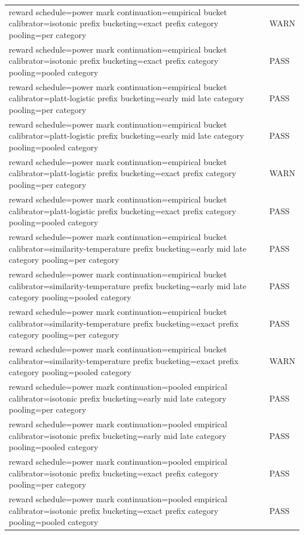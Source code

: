 \begin{table}[h]
\begin{tabular}{ll}
reward schedule=power mark  continuation=empirical bucket  calibrator=isotonic  prefix bucketing=exact prefix  category pooling=per category & WARN \\
reward schedule=power mark  continuation=empirical bucket  calibrator=isotonic  prefix bucketing=exact prefix  category pooling=pooled category & PASS \\
reward schedule=power mark  continuation=empirical bucket  calibrator=platt-logistic  prefix bucketing=early mid late  category pooling=per category & PASS \\
reward schedule=power mark  continuation=empirical bucket  calibrator=platt-logistic  prefix bucketing=early mid late  category pooling=pooled category & PASS \\
reward schedule=power mark  continuation=empirical bucket  calibrator=platt-logistic  prefix bucketing=exact prefix  category pooling=per category & WARN \\
reward schedule=power mark  continuation=empirical bucket  calibrator=platt-logistic  prefix bucketing=exact prefix  category pooling=pooled category & PASS \\
reward schedule=power mark  continuation=empirical bucket  calibrator=similarity-temperature  prefix bucketing=early mid late  category pooling=per category & PASS \\
reward schedule=power mark  continuation=empirical bucket  calibrator=similarity-temperature  prefix bucketing=early mid late  category pooling=pooled category & PASS \\
reward schedule=power mark  continuation=empirical bucket  calibrator=similarity-temperature  prefix bucketing=exact prefix  category pooling=per category & PASS \\
reward schedule=power mark  continuation=empirical bucket  calibrator=similarity-temperature  prefix bucketing=exact prefix  category pooling=pooled category & WARN \\
reward schedule=power mark  continuation=pooled empirical  calibrator=isotonic  prefix bucketing=early mid late  category pooling=per category & PASS \\
reward schedule=power mark  continuation=pooled empirical  calibrator=isotonic  prefix bucketing=early mid late  category pooling=pooled category & PASS \\
reward schedule=power mark  continuation=pooled empirical  calibrator=isotonic  prefix bucketing=exact prefix  category pooling=per category & PASS \\
reward schedule=power mark  continuation=pooled empirical  calibrator=isotonic  prefix bucketing=exact prefix  category pooling=pooled category & PASS \\

\end{tabular}
\end{table}

